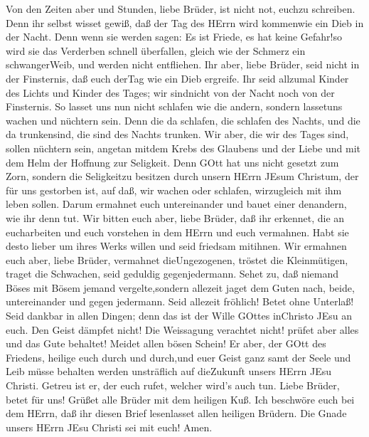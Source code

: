  Von den Zeiten aber und Stunden, liebe Brüder, ist nicht
not, euchzu schreiben.  Denn ihr selbst wisset gewiß, daß
der Tag des HErrn wird kommenwie ein Dieb in der Nacht. 
Denn wenn sie werden sagen: Es ist Friede, es hat keine Gefahr!so wird
sie das Verderben schnell überfallen, gleich wie der Schmerz ein
schwangerWeib, und werden nicht entfliehen.  Ihr aber, liebe
Brüder, seid nicht in der Finsternis, daß euch derTag wie ein Dieb
ergreife.  Ihr seid allzumal Kinder des Lichts und Kinder
des Tages; wir sindnicht von der Nacht noch von der Finsternis.
 So lasset uns nun nicht schlafen wie die andern, sondern
lassetuns wachen und nüchtern sein.  Denn die da schlafen,
die schlafen des Nachts, und die da trunkensind, die sind des Nachts
trunken.  Wir aber, die wir des Tages sind, sollen nüchtern
sein, angetan mitdem Krebs des Glaubens und der Liebe und mit dem Helm
der Hoffnung zur Seligkeit.  Denn GOtt hat uns nicht gesetzt
zum Zorn, sondern die Seligkeitzu besitzen durch unsern HErrn JEsum
Christum,  der für uns gestorben ist, auf daß, wir wachen
oder schlafen, wirzugleich mit ihm leben sollen.  Darum
ermahnet euch untereinander und bauet einer denandern, wie ihr denn tut.
 Wir bitten euch aber, liebe Brüder, daß ihr erkennet, die
an eucharbeiten und euch vorstehen in dem HErrn und euch vermahnen.
 Habt sie desto lieber um ihres Werks willen und seid
friedsam mitihnen.  Wir ermahnen euch aber, liebe Brüder,
vermahnet dieUngezogenen, tröstet die Kleinmütigen, traget die
Schwachen, seid geduldig gegenjedermann.  Sehet zu, daß
niemand Böses mit Bösem jemand vergelte,sondern allezeit jaget dem Guten
nach, beide, untereinander und gegen jedermann.  Seid
allezeit fröhlich!  Betet ohne Unterlaß!  Seid
dankbar in allen Dingen; denn das ist der Wille GOttes inChristo JEsu an
euch.  Den Geist dämpfet nicht!  Die
Weissagung verachtet nicht!  prüfet aber alles und das Gute
behaltet!  Meidet allen bösen Schein!  Er
aber, der GOtt des Friedens, heilige euch durch und durch,und euer Geist
ganz samt der Seele und Leib müsse behalten werden unsträflich auf
dieZukunft unsers HErrn JEsu Christi.  Getreu ist er, der
euch rufet, welcher wird's auch tun.  Liebe Brüder, betet
für uns!  Grüßet alle Brüder mit dem heiligen Kuß.
 Ich beschwöre euch bei dem HErrn, daß ihr diesen Brief
lesenlasset allen heiligen Brüdern.  Die Gnade unsers HErrn
JEsu Christi sei mit euch! Amen.
